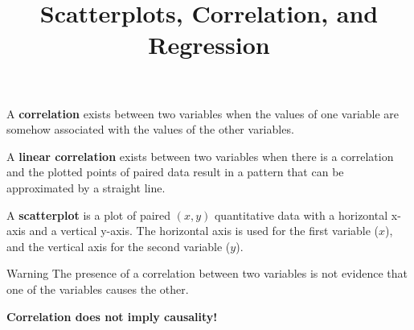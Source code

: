 \documentclass{beamer}
\title[MA205 - Section 2.4]{Scatterplots, Correlation, and Regression}
\begin{document}
\begin{frame}
\titlepage
\end{frame}

\begin{frame}
\begin{definition}
A \textbf{correlation} exists between two variables when the values of one variable are somehow associated with the values of the other variables.
\end{definition}\pause

\begin{definition}
A \textbf{linear correlation} exists between two variables when there is a correlation and the plotted points of paired data result in a pattern that can be approximated by a straight line.
\end{definition}\pause

\begin{definition}
A \textbf{scatterplot} is a plot of paired $(x,y)$ quantitative data with a horizontal x-axis and a vertical y-axis. The horizontal axis is used for the first variable ($x$), and the vertical axis for the second variable ($y$).
\end{definition}\pause

\begin{block}{Warning}
The presence of a correlation between two variables is not evidence that one of the variables causes the other.

\vspace{-3.5mm}
\begin{center}
\textbf{\Large
Correlation does not imply causality!}
\end{center}

\vspace{-4.5mm}
\end{block}
\end{frame}
\end{document}
